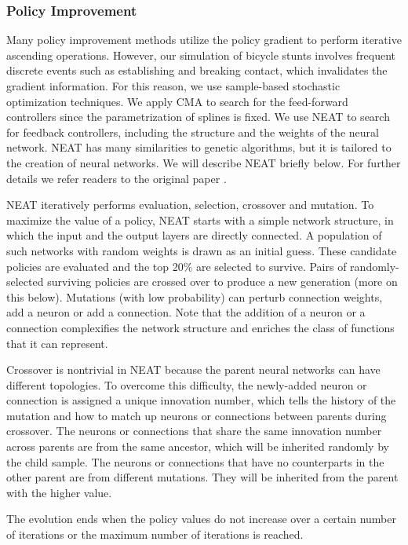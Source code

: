\subsubsection{Policy Improvement}
\label{sec:improvement}

Many policy improvement methods utilize the policy gradient \cite{Peters:2008} to perform iterative ascending operations. However, our simulation of bicycle stunts involves frequent discrete events such as establishing and breaking contact, which invalidates the gradient information. For this reason, we use sample-based stochastic optimization techniques. We apply CMA to search for the feed-forward controllers since the parametrization of splines is fixed. We use NEAT to search for feedback controllers, including the structure and the weights of the neural network. NEAT has many similarities to genetic algorithms, but it is tailored to the creation of neural networks. We will describe NEAT briefly below. For further details we refer readers to the original paper \cite{Stanley:2002:ENN}.

NEAT iteratively performs evaluation, selection, crossover and mutation. To maximize the value of a policy, NEAT starts with a simple network structure, in which the input and the output layers are directly connected. A population of such networks with random weights is drawn as an initial guess. These candidate policies are evaluated and the top 20\% are selected to survive. Pairs of randomly-selected surviving policies are crossed over to produce a new generation (more on this below). Mutations (with low probability) can perturb connection weights, add a neuron or add a connection. Note that the addition of a neuron or a connection complexifies the network structure and enriches the class of functions that it can represent.

Crossover is nontrivial in NEAT because the parent neural networks can have different topologies. To overcome this difficulty, the newly-added neuron or connection is assigned a unique innovation number, which tells the history of the mutation and how to match up neurons or connections between parents during crossover. The neurons or connections that share the same innovation number across parents are from the same ancestor, which will be inherited randomly by the child sample. The neurons or connections that have no counterparts in the other parent are from different mutations. They will be inherited from the parent with the higher value.

The evolution ends when the policy values do not increase over a certain number of iterations or the maximum number of iterations is reached.

